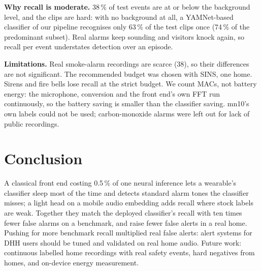 \documentclass[conference]{IEEEtran}
\begin{document}
\textbf{Why recall is moderate.} 38\,\% of test events are at or below the background level, and the clips are hard: with no
background at all, a YAMNet-based classifier of our pipeline recognises only 63\,\% of the test clips once (74\,\% of the
predominant subset). Real alarms keep sounding and visitors knock again, so recall per event understates detection over an
episode.

\textbf{Limitations.} Real smoke-alarm recordings are scarce (38), so their differences are not significant. The recommended
budget was chosen with SINS, one home. Sirens and fire bells lose recall at the strict budget. We count MACs, not battery
energy: the microphone, conversion and the front end's own FFT run continuously, so the battery saving is smaller than the
classifier saving. mn10's own labels could not be used; carbon-monoxide alarms were left out for lack of public recordings.

\section{Conclusion}
A classical front end costing 0.5\,\% of one neural inference lets a wearable's classifier sleep most of the time and detects
standard alarm tones the classifier misses; a light head on a mobile audio embedding adds recall where stock labels are weak.
Together they match the deployed classifier's recall with ten times fewer false alarms on a benchmark, and raise fewer false
alerts in a real home. Pushing for more benchmark recall multiplied real false alerts: alert systems for DHH users should be
tuned and validated on real home audio. Future work: continuous labelled home recordings with real safety events, hard
negatives from homes, and on-device energy measurement.



\end{document}
